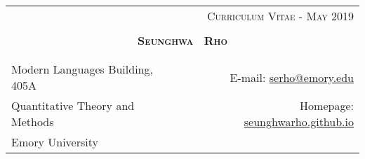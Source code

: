 \documentclass[10pt]{article}
\begin{document}
\begin{center}
\begin{tabular}{lr}
& \textsc{Curriculum Vitae - May 2019} \\
\multicolumn{2}{p{500pt}}{}\\
\multicolumn{2}{c}{{\Large \textsc{\textbf{Seunghwa \ Rho }}}} \\\\ 
\hline\\
Modern Languages Building, 405A   & E-mail: \href{mailto:serho@emory.edu}{serho@emory.edu} \\
\multicolumn{1}{l}{Quantitative Theory and Methods}& Homepage: \href{https://seunghwarho.github.io}{seunghwarho.github.io}\\
\multicolumn{2}{l}{Emory University}\\
\end{tabular}


\end{center}
\end{document}
